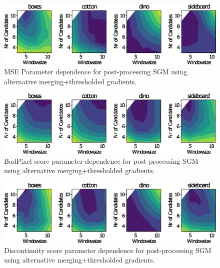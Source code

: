 \documentclass  [
  paper    = a4,
  BCOR     = 10mm,
  twoside,
  fontsize = 12pt,
  fleqn,
  toc      = bibnumbered,
  toc      = listofnumbered,
  numbers  = noendperiod,
  headings = normal,
  listof   = leveldown,
  version  = 3.03
]                                       {scrreprt}
\begin{document}
\begin{figure}[h!]
	\centering
	\includegraphics[width=1\linewidth]{images/choose_lower_sgm_ppr_contour_mse_100}
	\caption[Parameter dependence for post-processing SGM using alternative merging+thresholded gradients.]{MSE Parameter dependence for post-processing SGM using alternative merging+thresholded gradients.}
	\label{fig:chooselowersgmpprcontourmse100}
\end{figure}

\begin{figure}[h!]
	\centering
	\includegraphics[width=1\linewidth]{images/choose_lower_sgm_ppr_contour_badpix_0070}
	\caption[BadPixel parameter dependence for post-processing SGM using alternative merging+thresholded gradients.]{BadPixel score parameter dependence for post-processing SGM using alternative merging+thresholded gradients.}
	\label{fig:chooselowersgmpprcontourbadpix_0070}
\end{figure}

\begin{figure}[h!]
	\centering
	\includegraphics[width=1\linewidth]{images/choose_lower_sgm_ppr_contour_discontinuities_0070}
	\caption[Discontinuity score parameter dependence for post-processing SGM using alternative merging+thresholded gradients.]{Discontinuity score parameter dependence for post-processing SGM using alternative merging+thresholded gradients.}
	\label{fig:chooselowersgmpprcontourbadpixel_discontinuities0070}
\end{figure}
\end{document}
